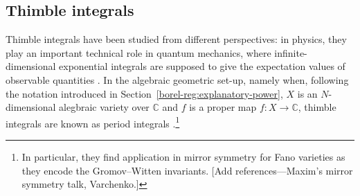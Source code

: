\documentclass{article}
\newcommand{\C}{\mathbb{C}}
\theoremstyle{definition}
\newtheorem{remark}[definition]{Remark}
\theoremstyle{plain}
\newenvironment{todo}{\color{Coral}}{\color{black}}
\begin{document}

%
%
%
\subsection{Thimble integrals}
%
Thimble integrals have been studied from different perspectives: in physics, they play an important technical role in quantum mechanics, where infinite-dimensional exponential integrals are supposed to give the expectation values of observable quantities \cite{dunne-unsal2,dunne-unsal,Fauvet_Menous_Queva,Tanizaki:2014tua}. In the algebraic geometric set-up, namely when, following the notation introduced in Section~\ref{borel-reg:explanatory-power}, $X$ is an $N$-dimensional alegbraic variety over $\C$ and $f$ is a proper map $f\colon X\to\C$, thimble integrals are known as period integrals \cite{deligne2007singularites,Maxim_lectures,pham}.\footnote{In particular, they find application in mirror symmetry for Fano varieties as they encode the Gromov--Witten invariants. \begin{todo}[Add references---Maxim's mirror symmetry talk, Varchenko.]\end{todo}}
\end{document}
